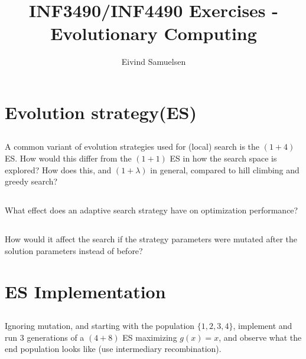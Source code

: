 
\title{\vspace{-2cm}INF3490/INF4490 Exercises - Evolutionary Computing}
\author{Eivind Samuelsen}
\date{}

\setlength\parindent{0pt}


    \renewcommand\marginsymbol[1][0pt]{%
  \tabto*{0cm}\makebox[-1cm][c]{$\mathbb{P}$}\tabto*{\TabPrevPos}}

\maketitle


\section{Evolution strategy(ES)} %
\subsection{} %
A common variant of evolution strategies used for (local) search is the \((1 + 4)\) ES.
How would this differ from the \((1 + 1)\) ES in how the search space is explored?
How does this, and \((1 + \lambda)\) in general, compared to hill climbing and greedy search?
\subsection{} %
What effect does an adaptive search strategy have on optimization performance?
\subsection{} %
How would it affect the search if the strategy parameters were mutated after the solution parameters instead of before?
\section{ES Implementation} %
\subsection{\marginsymbol} %
\label{subsec:w4e3a}
Ignoring mutation, and starting with the population \(\{1, 2, 3, 4\}\),
implement and run 3 generations of a \((4 + 8)\) ES maximizing \(g(x) = x\),
and observe what the end population looks like (use intermediary recombination).
